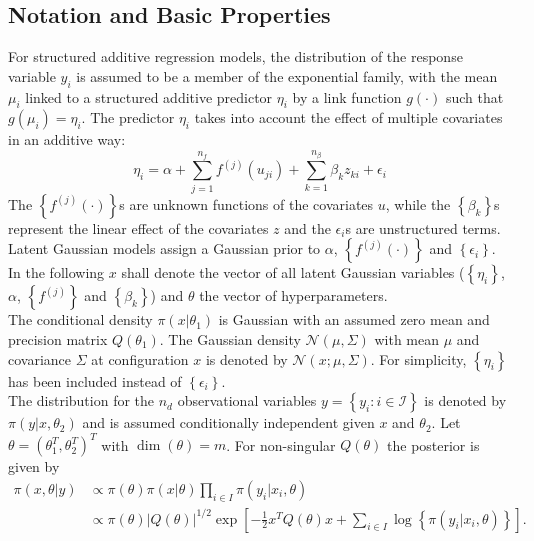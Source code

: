 \documentclass[12pt]{book}
\begin{document}
\subsection{Notation and Basic Properties}
\label{sec:notation}
For structured additive regression models, the distribution of the response variable $y_i$ is assumed to be a member of the exponential family, with the mean $\mu_i$ linked to a structured additive predictor $\eta_i$ by a link function $g\left(\cdot\right)$ such that $g\left(\mu_i\right)=\eta_i$. The predictor $\eta_i$  takes into account the effect of multiple covariates in an additive way:
\begin{equation}\label{eq:predictor}
    \eta_i=\alpha+\sum_{j=1}^{n_f}f^{(j)}\left(u_{ji}\right)+\sum_{k=1}^{n_{\beta}}\beta_kz_{ki}+\epsilon_i
\end{equation}
The $\left\lbrace f^{(j)}\left(\cdot\right)\right\rbrace$s are unknown functions of the covariates $u$, while the $\left\lbrace\beta_k\right\rbrace$s represent the linear effect of the covariates $z$ and the $\epsilon_i$s are unstructured terms. Latent Gaussian models assign a Gaussian prior to $\alpha$, $\left\lbrace f^{(j)}\left(\cdot\right)\right\rbrace$ and $\left\lbrace\epsilon_i\right\rbrace$. In the following $x$ shall denote the vector of all latent Gaussian variables ($\left\lbrace\eta_i\right\rbrace$, $\alpha$, $\left\lbrace f^{(j)}\right\rbrace$ and $\left\lbrace\beta_k\right\rbrace$) and $\theta$ the vector of hyperparameters. \\
The conditional density $\pi\left(x|\theta_1\right)$ is Gaussian with an assumed zero mean and precision matrix $Q\left(\theta_1\right)$. The Gaussian density $\mathcal{N}\left(\mu,\Sigma\right)$ with mean $\mu$ and covariance $\Sigma$ at configuration $x$ is denoted by $\mathcal{N}\left(x;\mu,\Sigma\right)$. For simplicity, $\left\lbrace\eta_i\right\rbrace$ has been included instead of $\left\lbrace\epsilon_i\right\rbrace$. \\
The distribution for the $n_d$ observational variables $y=\left\lbrace y_i:i\in\mathcal{I}\right\rbrace$ is denoted by $\pi\left(y|x, \theta_2\right)$ and is assumed conditionally independent given $x$ and $\theta_2$. Let $\theta=\left(\theta_1^T,\theta_2^T\right)^T$ with $\dim\left(\theta\right)=m$. For non-singular $Q\left(\theta\right)$ the posterior is given by
\begin{align}
    \pi\left(x,\theta|y\right)&\propto\pi\left(\theta\right)\pi\left(x|\theta\right)\prod_{i\in I}\pi\left(y_i|x_i,\theta\right) \nonumber\\
    &\propto \pi\left(\theta\right)\left|Q\left(\theta\right)\right|^{1/2}\exp\left[-\frac{1}{2}x^TQ\left(\theta\right)x+\sum_{i\in I}\log\left\lbrace\pi\left(y_i|x_i,\theta\right)\right\rbrace\right].
\end{align}
\end{document}
